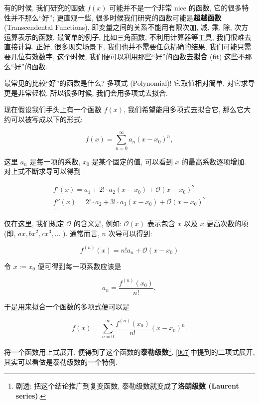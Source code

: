 \begin{tcolorbox}[size=fbox, breakable, enhanced jigsaw, title={泰勒级数 (Taylor Series)}]

有的时候, 我们研究的函数 $f(x)$ 可能并不是一个非常 nice 的函数,
它的很多特性并不那么``好''; 更直观一些,
很多时候我们研究的函数可能是\textbf{超越函数} (Transcendental
Functions), 即变量之间的关系不能用有限次加, 减, 乘, 除,
次方运算表示的函数, 最简单的例子, 比如三角函数, 不利用计算器等工具,
我们很难去直接计算. 正好, 很多现实场景下, 我们也并不需要任意精确的结果,
我们可能只需要几位有效数字, 这个时候,
我们便可以利用那些``好''的函数去\textbf{拟合} (fit)
这些不那么``好''的函数.

最常见的比较``好''的函数是什么? 多项式 (Polynomial)! 它取值相对简单,
对它求导更是非常轻松. 所以很多时候, 我们会用多项式去拟合.

现在假设我们手头上有一个函数 $f(x)$, 我们希望能用多项式去拟合它,
那么它大约可以被写成以下的形式:

\[
f(x)=\sum_{n=0}^\infty a_n(x-x_0)^n,
\]

这里 $a_n$ 是每一项的系数, $x_0$ 是某个固定的值, 可以看到 $x$
的最高系数逐项增加. 对上式不断求导可以得到

\begin{gather*}
f'(x)=a_1+2!\cdot a_2(x-x_0)+\mathcal{O}(x-x_0)^2\\
f''(x)=2!\cdot a_2+3!\cdot a_3(x-x_0)+\mathcal{O}(x-x_0)^2\\
...
\end{gather*}

仅在这里, 我们规定 $\mathcal{O}$ 的含义是, 例如: $\mathcal{O}(x)$
表示包含 $x$ 以及 $x$ 更高次数的项 (即, $ax, bx^2, cx^3, ...$ ).
通常而言, $n$ 次导可以得到:

\[
f^{(n)}(x)=n!a_n+\mathcal{O}(x-x_0)
\]

令 $x:=x_0$ 便可得到每一项系数应该是

\[
a_n=\frac{f^{(n)}(x_0)}{n!},
\]

于是用来拟合一个函数的多项式便可以是

\[
\boxed{f(x)=\sum_{n=0}^\infty\frac{f^{(n)}(x_0)}{n!}(x-x_0)^n.}
\]

将一个函数用上式展开, 便得到了这个函数的\textbf{泰勒级数}\footnote{剧透:
  把这个结论推广到复变函数, 泰勒级数就变成了\textbf{洛朗级数 (Laurent
  series)}.}. \ref{007}中提到的二项式展开,
其实可以看做是泰勒级数的一个特例.

\begin{tcolorbox}[size=fbox, breakable, enhanced jigsaw, title={收敛性}]


\end{tcolorbox}
\end{tcolorbox}
